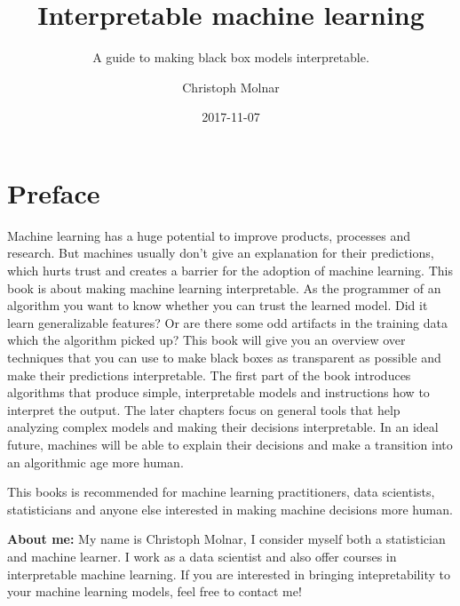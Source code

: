 \documentclass[12pt,]{krantz}
\title{Interpretable machine learning}
\subtitle{A guide to making black box models interpretable.}
\author{Christoph Molnar}
\date{2017-11-07}
\theoremstyle{definition}
\theoremstyle{definition}
\theoremstyle{definition}
\theoremstyle{remark}
\begin{document}
\maketitle



\setlength{\abovedisplayskip}{-5pt}
\setlength{\abovedisplayshortskip}{-5pt}

{
\hypersetup{linkcolor=black}
\setcounter{tocdepth}{1}
\tableofcontents
}
\chapter*{Preface}\label{preface}

Machine learning has a huge potential to improve products, processes and
research. But machines usually don't give an explanation for their
predictions, which hurts trust and creates a barrier for the adoption of
machine learning. This book is about making machine learning
interpretable. As the programmer of an algorithm you want to know
whether you can trust the learned model. Did it learn generalizable
features? Or are there some odd artifacts in the training data which the
algorithm picked up? This book will give you an overview over techniques
that you can use to make black boxes as transparent as possible and make
their predictions interpretable. The first part of the book introduces
algorithms that produce simple, interpretable models and instructions
how to interpret the output. The later chapters focus on general tools
that help analyzing complex models and making their decisions
interpretable. In an ideal future, machines will be able to explain
their decisions and make a transition into an algorithmic age more
human.

This books is recommended for machine learning practitioners, data
scientists, statisticians and anyone else interested in making machine
decisions more human.

\textbf{About me:} My name is Christoph Molnar, I consider myself both a
statistician and machine learner. I work as a data scientist and also
offer courses in interpretable machine learning. If you are interested
in bringing intepretability to your machine learning models, feel free
to contact me!
\end{document}
